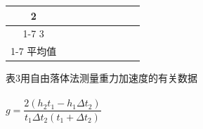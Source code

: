 \documentclass{ctexart}
\begin{document}
\begin{table}[]
\begin{tabular}{|c|ccc|c|c|c|c|c|}
2                                       & \multicolumn{1}{c|}{}   & \multicolumn{1}{c|}{}                                                 &                                                  &                                                                    &                                                                        &                                                                        &                                                                      &                                                                      \\ \cline{1-7}
3                                       & \multicolumn{1}{c|}{}   & \multicolumn{1}{c|}{}                                                 &                                                  &                                                                    &                                                                        &                                                                        &                                                                      &                                                                      \\ \cline{1-7}
平均值                                     & \multicolumn{1}{c|}{}   & \multicolumn{1}{c|}{}                                                 &                                                  &                                                                    &                                                                        &                                                                        &                                                                      &                                                                      \\ \hline
\end{tabular}
\end{table}
表3\hspace{3em}用自由落体法测量重力加速度的有关数据\\
\\
$g=\dfrac{2(h_2t_1-h_1\Delta t_2)}{t_1\Delta t_2(t_1+\Delta t_2)}$\\
\end{document}
